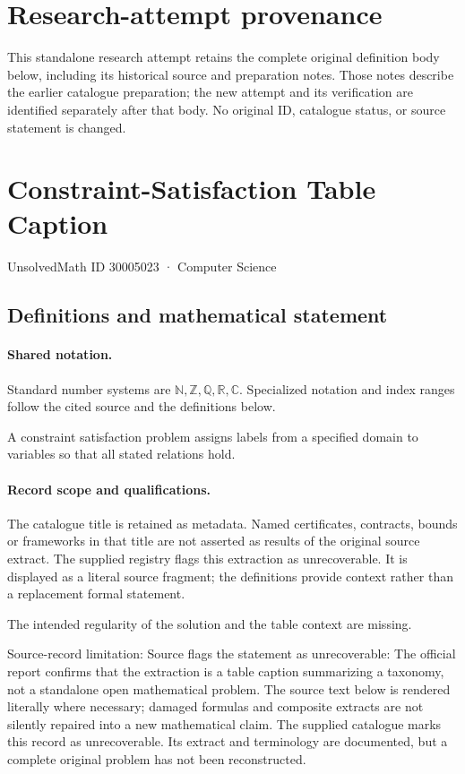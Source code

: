 \documentclass[11pt]{article}
\begin{document}
\section*{Research-attempt provenance}
This standalone research attempt retains the complete original definition body below,
including its historical source and preparation notes. Those notes describe the
earlier catalogue preparation; the new attempt and its verification are identified
separately after that body. No original ID, catalogue status, or source statement is changed.

\section{Constraint-Satisfaction Table Caption}\label{30005023}
{\small UnsolvedMath ID 30005023 · Computer Science}
\subsection{Definitions and mathematical statement}

\paragraph{Shared notation.}Standard number systems are $\mathbb N,\mathbb Z,\mathbb Q,\mathbb R,\mathbb C$. Specialized notation and index ranges follow the cited source and the definitions below.


A constraint satisfaction problem assigns labels from a specified domain to variables so that all stated relations hold.
\paragraph{Record scope and qualifications.}
The catalogue title is retained as metadata. Named certificates, contracts, bounds or frameworks in that title are not asserted as results of the original source extract.
The supplied registry flags this extraction as unrecoverable. It is displayed as a literal source fragment; the definitions provide context rather than a replacement formal statement.

The intended regularity of the solution and the table context are missing.

Source-record limitation: Source flags the statement as unrecoverable: The official report confirms that the extraction is a table caption summarizing a taxonomy, not a standalone open mathematical problem.
The source text below is rendered literally where necessary; damaged formulas and composite extracts are not silently repaired into a new mathematical claim.
The supplied catalogue marks this record as unrecoverable. Its extract and terminology are documented, but a complete original problem has not been reconstructed.
\end{document}
